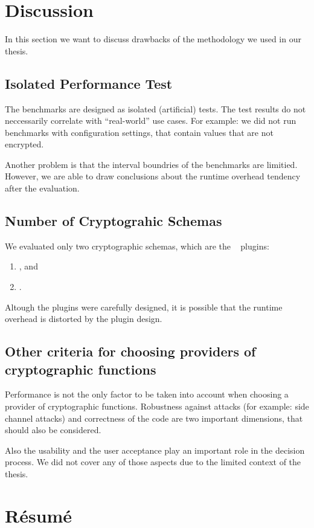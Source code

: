 
\section{Discussion}

In this section we want to discuss drawbacks of the methodology we used in our thesis.

	\subsection{Isolated Performance Test}

The benchmarks are designed as isolated (artificial) tests.
The test results do not neccessarily correlate with ``real-world'' use cases.
For example: we did not run benchmarks with configuration settings, that contain values that are not encrypted.

Another problem is that the interval boundries of the benchmarks are limitied.
However, we are able to draw conclusions about the runtime overhead tendency after the evaluation.

	\subsection{Number of Cryptograhic Schemas}

We evaluated only two cryptographic schemas, which are the \elektra~ plugins:
\begin{enumerate}
\item \crypto, and
\item \fcrypt.
\end{enumerate}

Altough the plugins were carefully designed, it is possible that the runtime overhead is distorted by the plugin design.

	\subsection{Other criteria for choosing providers of cryptographic functions}

Performance is not the only factor to be taken into account when choosing a provider of cryptographic functions.
Robustness against attacks (for example: side channel attacks) and correctness of the code are two important dimensions, that should also be considered.

Also the usability and the user acceptance play an important role in the decision process.
We did not cover any of those aspects due to the limited context of the thesis.

\section{Résumé}

